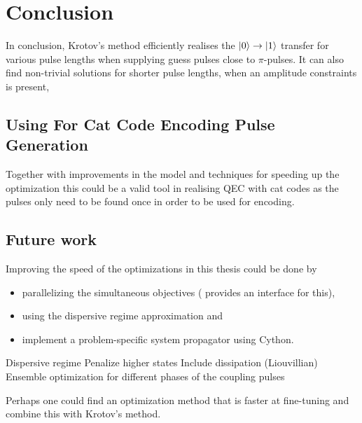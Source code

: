 \documentclass[main.tex]{subfiles}
\begin{document}
\chapter{Conclusion}

In conclusion, Krotov's method efficiently realises the \(\ket{0}\rightarrow\ket{1}\) transfer for various pulse lengths when supplying guess pulses close to \(\pi\)-pulses.
It can also find non-trivial solutions for shorter pulse lengths, when an amplitude constraints is present,


\section{Using \krotov{} For Cat Code Encoding Pulse Generation}

Together with improvements in the model and techniques for speeding up the optimization this could be a valid tool in realising QEC with cat codes as the pulses only need to be found once in order to be used for encoding.

\section{Future work}
\label{sec:future-work}

Improving the speed of the optimizations in this thesis could be done by
\begin{itemize}
    \item parallelizing the simultaneous objectives (\krotov{} provides an interface for this),
    \item using the dispersive regime approximation and
    \item implement a problem-specific system propagator using Cython.
\end{itemize}

Dispersive regime
Penalize higher states
Include dissipation (Liouvillian)
Ensemble optimization for different phases of the coupling pulses

Perhaps one could find an optimization method that is faster at fine-tuning and combine this with Krotov's method.
\end{document}

